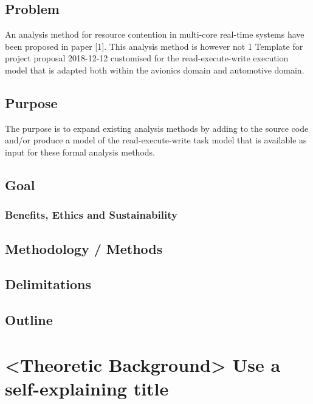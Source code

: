 \documentclass{kththesis}
\begin{document}
\section{Problem}

An analysis method for resource contention in multi-core real-time systems have been proposed in
paper [1]. This analysis method is however not 1 Template for project proposal 2018-12-12 customised
for the read-execute-write execution model that is adapted both within the avionics domain and
automotive domain.


\section{Purpose}

The purpose is to expand existing analysis methods by adding to the source code and/or produce a
model of the read-execute-write task model that is available as input for these formal analysis
methods.


\section{Goal}



\subsection{Benefits, Ethics and Sustainability}

\section{Methodology / Methods}

\section{Delimitations}

\section{Outline}



\chapter{<Theoretic Background> Use a self-explaining title}
\end{document}
